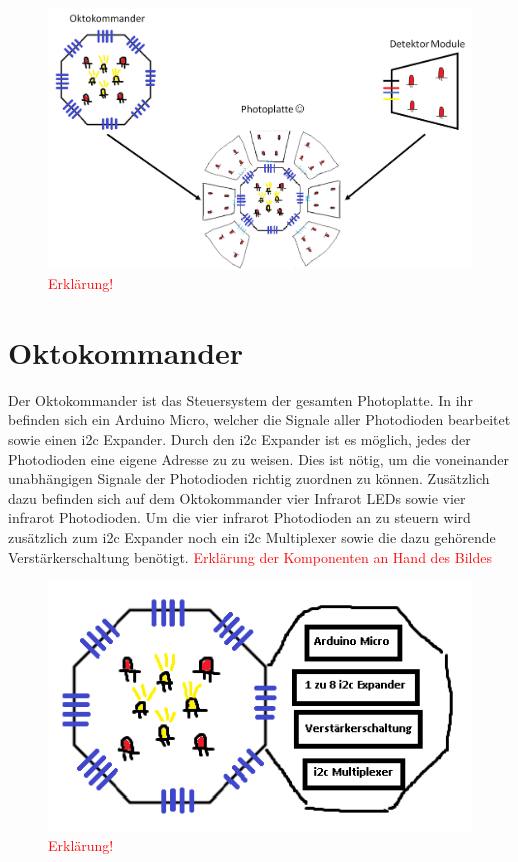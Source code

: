 \begin{figure}[h]
	\centering
	\includegraphics[scale=0.5]{../figures/Photoplatte.png}
	\caption{\textcolor{red}{Erklärung!}}
	\label{fig:Fotoplatte}
\end{figure}


\section{Oktokommander}
\label{sec:Oktokommander}

Der Oktokommander ist das Steuersystem der gesamten Photoplatte. In ihr befinden sich ein Arduino Micro, welcher die Signale aller Photodioden bearbeitet sowie einen i2c Expander. Durch den i2c Expander ist es möglich, jedes der Photodioden eine eigene Adresse zu zu weisen. Dies ist nötig, um die voneinander unabhängigen Signale der Photodioden richtig zuordnen zu können. Zusätzlich dazu befinden sich auf dem Oktokommander vier Infrarot LEDs sowie vier infrarot Photodioden. Um die vier infrarot Photodioden an zu steuern wird zusätzlich zum i2c Expander noch ein i2c Multiplexer sowie die dazu gehörende Verstärkerschaltung benötigt. 
\textcolor{red}{Erklärung der Komponenten an Hand des Bildes}

\begin{figure}[h]
	\centering
	\includegraphics[scale=0.8]{../figures/OktokommanderOffen.png}
	\caption{\textcolor{red}{Erklärung!}}
	\label{fig:OktokommanderOffen}
\end{figure}

